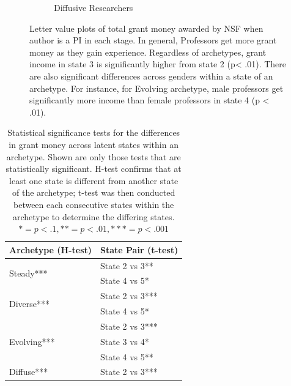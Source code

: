 \begin{figure}[tbh]
\begin{subfigure}{0.5\textwidth}
        \caption{Diffusive Researchers}
    \end{subfigure}
    \caption{\small \label{fig:grantanalysis} Letter value plots of total grant money awarded by NSF when author is a PI in each stage. In general, Professors get more grant money as they gain experience. Regardless of archetypes, grant income in state 3 is significantly higher from state 2 (p< .01). There are also significant differences across genders within a state of an archetype. For instance, for Evolving archetype, male professors get significantly more income than female professors in state 4 (p < .01).}
\end{figure}

\begin{table}[tbh]
\centering
\begin{tabular}{ll}
\toprule
Archetype (H-test) &  State Pair (t-test)  \\
\midrule
\multirow{2}{*}{Steady***}    & State 2 vs 3**    \\
                     & State 4 vs 5*    \\
\hline
\multirow{2}{*}{Diverse***}   & State 2 vs 3*** \\
                                    & State 4 vs 5*    \\ \hline
\multirow{3}{*}{Evolving***}  & State 2 vs 3***   \\
                         & State 3 vs 4*    \\
                        & State 4 vs 5**    \\ \hline
\multirow{1}{*}{Diffuse***}   & State 2 vs 3***     \\
\bottomrule
\end{tabular}
\caption{ \small Statistical significance tests for the differences in grant money across latent states within an archetype. Shown are only those tests that are statistically significant. H-test \cite{Kruskal:1952} confirms that at least one state is different from another state of the archetype; t-test \cite{Welch:1947} was then conducted between each consecutive states within the archetype to determine the differing states. $* = p < .1, ** = p< .01, *{*}* = p < .001$ }
\label{tab:statstate}
\end{table}


